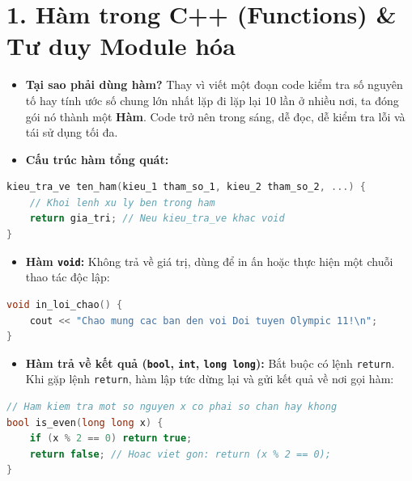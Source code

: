 \documentclass[11pt,a4paper]{article}
\begin{document}
\vspace{-0.15cm}
\section*{\color{AsianDarkBlue}\normalsize 1. Hàm trong C++ (Functions) \& Tư duy Module hóa}
\vspace{-0.2cm}
\begin{itemize}
    \setlength{\itemsep}{1pt}
    \footnotesize
    \item \textbf{Tại sao phải dùng hàm?} Thay vì viết một đoạn code kiểm tra số nguyên tố hay tính ước số chung lớn nhất lặp đi lặp lại 10 lần ở nhiều nơi, ta đóng gói nó thành một \textbf{Hàm}. Code trở nên trong sáng, dễ đọc, dễ kiểm tra lỗi và tái sử dụng tối đa.
    \item \textbf{Cấu trúc hàm tổng quát:}
\end{itemize}

\begin{lstlisting}[language=C++]
kieu_tra_ve ten_ham(kieu_1 tham_so_1, kieu_2 tham_so_2, ...) {
    // Khoi lenh xu ly ben trong ham
    return gia_tri; // Neu kieu_tra_ve khac void
}
\end{lstlisting}

\begin{itemize}
    \setlength{\itemsep}{1pt}
    \footnotesize
    \item \textbf{Hàm \texttt{void}:} Không trả về giá trị, dùng để in ấn hoặc thực hiện một chuỗi thao tác độc lập:
\end{itemize}

\begin{lstlisting}[language=C++]
void in_loi_chao() {
    cout << "Chao mung cac ban den voi Doi tuyen Olympic 11!\n";
}
\end{lstlisting}

\begin{itemize}
    \setlength{\itemsep}{1pt}
    \footnotesize
    \item \textbf{Hàm trả về kết quả (\texttt{bool}, \texttt{int}, \texttt{long long}):} Bắt buộc có lệnh \texttt{return}. Khi gặp lệnh \texttt{return}, hàm lập tức dừng lại và gửi kết quả về nơi gọi hàm:
\end{itemize}

\begin{lstlisting}[language=C++]
// Ham kiem tra mot so nguyen x co phai so chan hay khong
bool is_even(long long x) {
    if (x % 2 == 0) return true;
    return false; // Hoac viet gon: return (x % 2 == 0);
}
\end{lstlisting}
\end{document}
